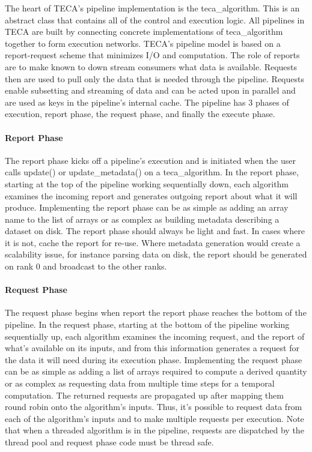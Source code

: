 \documentclass[a4paper,10pt,DIV=12]{scrreprt}
\begin{document}
The heart of TECA's pipeline implementation is the teca\_algorithm. This is an abstract class that contains all of the control and execution logic. All pipelines in TECA are built by connecting concrete implementations of teca\_algorithm together to form execution networks. TECA's pipeline model is based on a report-request scheme that minimizes I/O and computation. The role of reports are to make known to down stream consumers what data is available. Requests then are used to pull only the data that is needed through the pipeline. Requests enable subsetting and streaming of data and can be acted upon in parallel and are used as keys in the pipeline's internal cache. The pipeline has 3 phases of execution, report phase, the request phase, and finally the execute phase.

\paragraph{Report Phase} The report phase kicks off a pipeline's execution and is initiated when the user calls update() or update\_metadata() on a teca\_algorithm. In the report phase, starting at the top of the pipeline working sequentially down, each algorithm examines the incoming report and generates outgoing report about what it will produce. Implementing the report phase can be as simple as adding an array name to the list of arrays or as complex as building metadata describing a dataset on disk. The report phase should always be light and fast. In cases where it is not, cache the report for re-use. Where metadata generation would create a scalability issue, for instance parsing data on disk, the report should be generated on rank 0 and broadcast to the other ranks.

\paragraph{Request Phase} The request phase begins when report the report phase reaches the bottom of the pipeline. In the request phase, starting at the bottom of the pipeline working sequentially up, each algorithm examines the incoming request, and the report of what's available on its inputs, and from this information generates a request for the data it will need during its execution phase. Implementing the request phase can be as simple as adding a list of arrays required to compute a derived quantity or as complex as requesting data from multiple time steps for a temporal computation. The returned requests are propagated up after mapping them round robin onto the algorithm's inputs. Thus, it's possible to request data from each of the algorithm's inputs and to make multiple requests per execution. Note that when a threaded algorithm is in the pipeline, requests are dispatched by the thread pool and request phase code must be thread safe.
\end{document}
